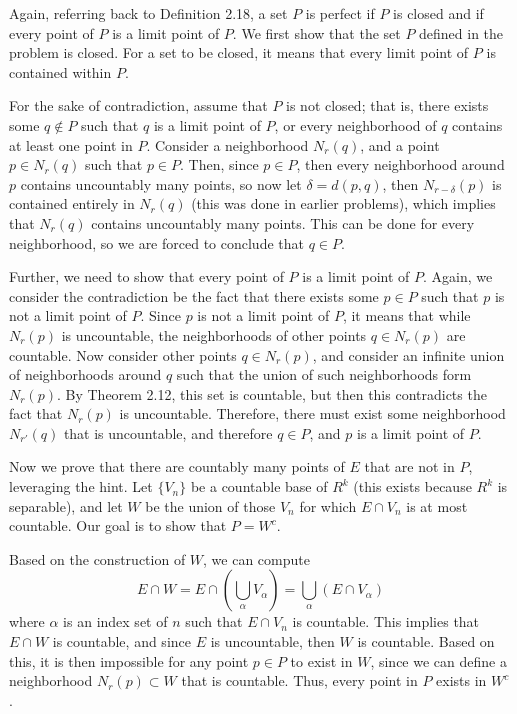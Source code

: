 \documentclass[10pt]{article}
\begin{document}
	\begin{solution}
		Again, referring back to Definition 2.18, a set \( P \) is perfect if \( P \) is closed 
		and if every point of  \( P \) is a limit point of \( P \). We first show that the set \( P \) defined 
		in the problem is closed. For a set to be closed, it means that every limit point of \( P \) is 
		contained within \( P \). 

		For the sake of contradiction, assume that \( P \) is not closed; that is, there exists some \( q \not \in P \) 
		such that \( q \) is a limit point of \( P \), or every neighborhood of \( q \) contains at least one 
		point in \( P \). Consider a neighborhood \( N_r(q) \), and a point \( p \in N_r(q) \) such that 
		\( p \in P \). Then, since \( p \in P \), then every neighborhood around \( p \) contains uncountably 
		many points, so now let \( \delta = d(p, q) \), then \( N_{r - \delta}(p) \) is contained entirely in 
		\( N_r(q) \) (this was done in earlier problems), which implies that \( N_r(q) \) contains 
		uncountably many points. This can be done for every neighborhood, so we are forced to conclude that 
		\( q \in P \). 

		Further, we need to show that every point of \( P \) is a limit point of \( P \). Again, we consider 
		the contradiction be the fact that there exists some \( p \in P \) such that \( p \) is not a limit 
		point of \( P \). Since \( p \) is not a limit point of \( P \), it means that while \( N_r(p) \) is 
		uncountable, the neighborhoods of other points \( q \in N_r(p) \) are countable.      
		Now consider other points \( q \in N_{r}(p) \), and consider an infinite union of neighborhoods around \( q \)
		such that the union of such neighborhoods form \( N_r(p) \). By Theorem 2.12, this set is 
		countable, but then this contradicts the fact that \( N_r(p)  \) is uncountable. Therefore, there must exist 
		some neighborhood \( N_{r'}(q) \) that is uncountable, and therefore \( q \in P \), and \( p \) is 
		a limit point of \( P \). 

		Now we prove that there are countably many points of \( E \) that are not in \( P \), leveraging the hint. Let 
		\( \{V_n\}  \) be a countable base of \( R^{k} \) (this exists because \( R^{k} \) is separable), 
		and let \( W \) be the union of those \( V_n \) for which 
		\( E \cap V_n \) is at most countable. Our goal is to show that \( P = W^{c} \). 

		Based on the construction of \( W \), we can compute 
		\[
			E \cap W = E\cap \left(\bigcup_{\alpha} V_{\alpha}\right) = 
			\bigcup_{\alpha} \left( E \cap V_{\alpha} \right) 
		\]
		where \( \alpha \) is an index set of  \( n \) such that \( E \cap V_n \) is countable. This 
		implies that \( E \cap W \) is countable, and since \( E \) is uncountable, then \( W \) is countable. 
		Based on this, it is then impossible for any point \( p \in P \) to exist in \( W \), since we can 
		define a neighborhood \( N_r(p) \subset W \) that is countable. Thus, every point in \( P \) exists
		in \( W^{c} \).   
	\end{solution}
\end{document}
